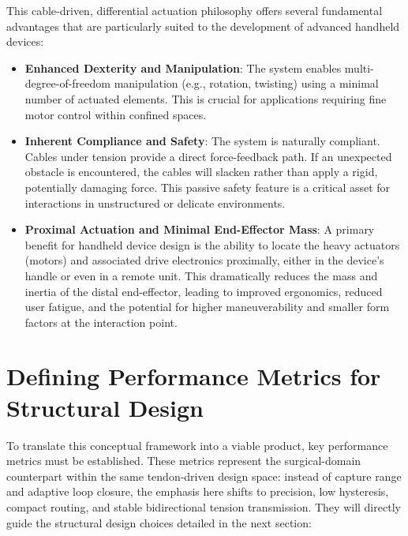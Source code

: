 This cable-driven, differential actuation philosophy offers several fundamental advantages that are particularly suited to the development of advanced handheld devices:

\begin{itemize}
\item \textbf{Enhanced Dexterity and Manipulation}: The system enables multi-degree-of-freedom manipulation (e.g., rotation, twisting) using a minimal number of actuated elements. This is crucial for applications requiring fine motor control within confined spaces.

\item \textbf{Inherent Compliance and Safety}: The system is naturally compliant. Cables under tension provide a direct force-feedback path. If an unexpected obstacle is encountered, the cables will slacken rather than apply a rigid, potentially damaging force. This passive safety feature is a critical asset for interactions in unstructured or delicate environments.

\item \textbf{Proximal Actuation and Minimal End-Effector Mass}: A primary benefit for handheld device design is the ability to locate the heavy actuators (motors) and associated drive electronics proximally, either in the device's handle or even in a remote unit. This dramatically reduces the mass and inertia of the distal end-effector, leading to improved ergonomics, reduced user fatigue, and the potential for higher maneuverability and smaller form factors at the interaction point.
\end{itemize}

\section{Defining Performance Metrics for Structural Design}

To translate this conceptual framework into a viable product, key performance metrics must be established. These metrics represent the surgical-domain counterpart within the same tendon-driven design space: instead of capture range and adaptive loop closure, the emphasis here shifts to precision, low hysteresis, compact routing, and stable bidirectional tension transmission. They will directly guide the structural design choices detailed in the next section:

